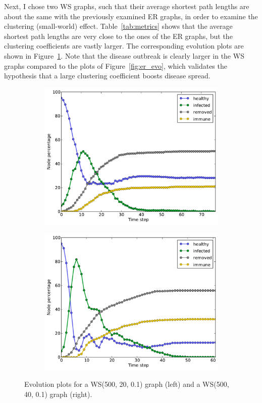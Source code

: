 \documentclass[11pt]{article} %
\begin{document}
Next, I chose two WS graphs, such that their average shortest path lengths
are about the same with the previously examined ER graphs, in order to
examine the clustering (small-world) effect. Table~\ref{tab:metrics} shows that
the average shortest path lengths are very close to the ones of the ER graphs,
but the clustering coefficients are vastly larger. The corresponding
evolution plots are shown in Figure~\ref{fig:ws_evo}. Note that the disease
outbreak is clearly larger in the WS graphs compared to the plots of
Figure~\ref{fig:er_evo}, which validates the hypothesis that a large clustering
coefficient boosts disease spread.

\begin{figure}[b]
  \begin{subfigure}[b]{0.5\textwidth}
    \centering
    \includegraphics[width=\textwidth]{figures/evo_WS_500_15_01}
  \end{subfigure}
  \begin{subfigure}[b]{0.5\textwidth}
    \centering
    \includegraphics[width=\textwidth]{figures/evo_WS_500_30_01}
  \end{subfigure}
  \caption{Evolution plots for a WS(500, 20, 0.1) graph (left) and a
    WS(500, 40, 0.1) graph (right).}
  \label{fig:ws_evo}
\end{figure}
\end{document}
